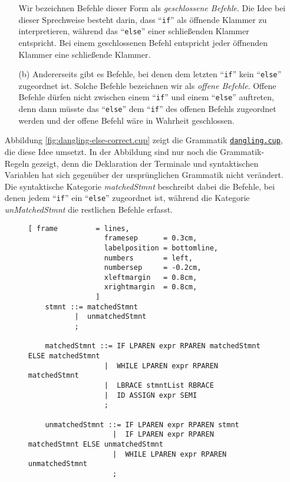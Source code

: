 \begin{enumerate}
\begin{enumerate}
            Wir bezeichnen Befehle dieser Form als \emph{geschlossene Befehle}.  Die Idee bei dieser
            Sprechweise besteht darin, dass ``\texttt{if}'' als \"offnende Klammer zu interpretieren,
            w\"ahrend das ``\texttt{else}'' einer schlie{\ss}enden Klammer entspricht.  Bei einem
            geschlossenen Befehl entspricht jeder \"offnenden Klammer eine schlie{\ss}ende Klammer.
     \item[(b)] Andererseits gibt es Befehle, bei denen dem letzten ``\texttt{if}'' kein
            ``\texttt{else}'' zugeordnet ist.  Solche Befehle bezeichnen wir als \emph{offene Befehle}.
            Offene Befehle d\"urfen nicht zwischen einem ``\texttt{if}'' und einem ``\texttt{else}''
            auftreten, denn dann m\"usste das ``\texttt{else}'' dem ``\texttt{if}'' des offenen
            Befehls zugeordnet werden und der offene Befehl w\"are in Wahrheit geschlossen.
     \end{enumerate}
      Abbildung \ref{fig:dangling-else-correct.cup} zeigt die Grammatik
      \href{https://github.com/karlstroetmann/Formal-Languages/tree/master/Cup/DanglingMatched/dangling.cup}{\texttt{dangling.cup}},
      die diese Idee umsetzt.  In der Abbildung sind nur noch die Grammatik-Regeln gezeigt, denn die
      Deklaration der Terminale und syntaktischen Variablen hat sich gegen\"uber der urspr\"unglichen
      Grammatik nicht ver\"andert. Die syntaktische Kategorie \textsl{matchedStmnt} beschreibt dabei
      die Befehle, bei denen jedem ``\texttt{if}'' ein ``\texttt{else}'' zugeordnet ist, w\"ahrend die
      Kategorie \textsl{unMatchedStmnt} die restlichen Befehle erfasst.

\begin{figure}[!ht]
\centering
\begin{Verbatim}[ frame         = lines, 
                  framesep      = 0.3cm, 
                  labelposition = bottomline,
                  numbers       = left,
                  numbersep     = -0.2cm,
                  xleftmargin   = 0.8cm,
                  xrightmargin  = 0.8cm,
                ]
    stmnt ::= matchedStmnt
           |  unmatchedStmnt
           ;
    
    matchedStmnt ::= IF LPAREN expr RPAREN matchedStmnt ELSE matchedStmnt
                  |  WHILE LPAREN expr RPAREN matchedStmnt
                  |  LBRACE stmntList RBRACE
                  |  ID ASSIGN expr SEMI
                  ;
    
    unmatchedStmnt ::= IF LPAREN expr RPAREN stmnt
                    |  IF LPAREN expr RPAREN matchedStmnt ELSE unmatchedStmnt
                    |  WHILE LPAREN expr RPAREN unmatchedStmnt
                    ;
          

\end{Verbatim}
\end{figure}
\end{enumerate}
